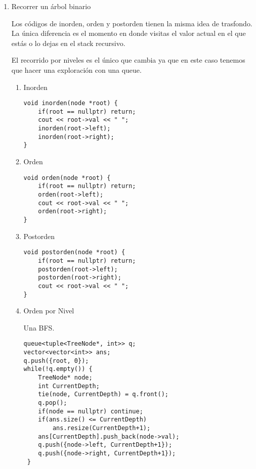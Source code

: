 \documentclass[11pt]{article}
\begin{document}
\begin{enumerate}
\item Recorrer un árbol binario
\label{sec:org405f023}

Los códigos de inorden, orden y postorden tienen la misma idea de trasfondo.
La única diferencia es el momento en donde visitas el valor actual en el que
estás o lo dejas en el stack recursivo.

El recorrido por niveles es el único que cambia ya que en este caso tenemos
que hacer una exploración con una queue.

\begin{enumerate}
\item Inorden
\label{sec:org3bcbc77}

\lstset{language=C++,label= ,caption= ,captionpos=b,numbers=none}
\begin{lstlisting}
void inorden(node *root) {
	if(root == nullptr) return;
	cout << root->val << " ";
	inorden(root->left);
	inorden(root->right);
}
\end{lstlisting}

\item Orden
\label{sec:orgd7e2de9}

\lstset{language=C++,label= ,caption= ,captionpos=b,numbers=none}
\begin{lstlisting}
void orden(node *root) {
	if(root == nullptr) return;
	orden(root->left);
	cout << root->val << " ";
	orden(root->right);
}
\end{lstlisting}

\item Postorden
\label{sec:org3354989}

\lstset{language=C++,label= ,caption= ,captionpos=b,numbers=none}
\begin{lstlisting}
void postorden(node *root) {
	if(root == nullptr) return;
	postorden(root->left);
	postorden(root->right);
	cout << root->val << " ";
}
\end{lstlisting}

\item Orden por Nivel
\label{sec:orgdc3987d}

Una BFS.
\lstset{language=C++,label= ,caption= ,captionpos=b,numbers=none}
\begin{lstlisting}
queue<tuple<TreeNode*, int>> q;
vector<vector<int>> ans;
q.push({root, 0});
while(!q.empty()) {
	TreeNode* node;
	int CurrentDepth;
	tie(node, CurrentDepth) = q.front();
	q.pop();
	if(node == nullptr) continue;
	if(ans.size() <= CurrentDepth)
		ans.resize(CurrentDepth+1);
	ans[CurrentDepth].push_back(node->val);
	q.push({node->left, CurrentDepth+1});
	q.push({node->right, CurrentDepth+1});
 }
\end{lstlisting}
\end{enumerate}
\end{enumerate}
\end{document}
